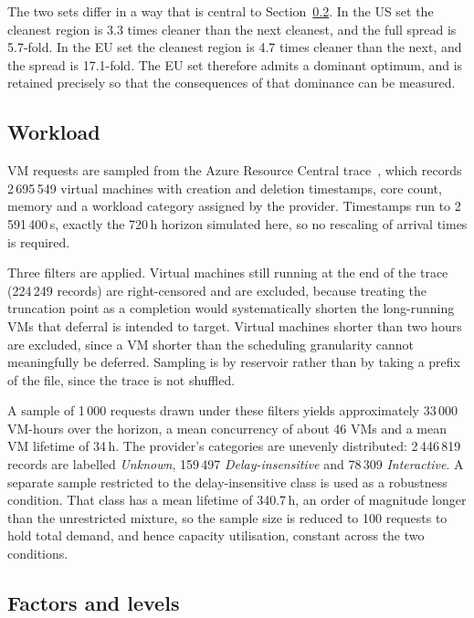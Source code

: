 The two sets differ in a way that is central to
Section~\ref{sec:design-factors}. In the US set the cleanest region is 3.3
times cleaner than the next cleanest, and the full spread is 5.7-fold. In the
EU set the cleanest region is 4.7 times cleaner than the next, and the spread is
17.1-fold. The EU set therefore admits a dominant optimum, and is retained
precisely so that the consequences of that dominance can be measured.

\subsection{Workload}

VM requests are sampled from the Azure Resource Central
trace~\cite{cortez2017resourcecentral,azurepublicdataset}, which records 2\,695\,549 virtual machines with creation and
deletion timestamps, core count, memory and a workload category assigned by the
provider. Timestamps run to 2\,591\,400\,s, exactly the 720\,h horizon
simulated here, so no rescaling of arrival times is required.

Three filters are applied. Virtual machines still running at the end of the
trace (224\,249 records) are right-censored and are excluded, because treating
the truncation point as a completion would systematically shorten the
long-running VMs that deferral is intended to target. Virtual machines shorter
than two hours are excluded, since a VM shorter than the scheduling granularity
cannot meaningfully be deferred. Sampling is by reservoir rather than by taking
a prefix of the file, since the trace is not shuffled.

A sample of 1\,000 requests drawn under these filters yields approximately
33\,000 VM-hours over the horizon, a mean concurrency of about 46 VMs and a
mean VM lifetime of 34\,h. The provider's categories are unevenly distributed:
2\,446\,819 records are labelled \emph{Unknown}, 159\,497
\emph{Delay-insensitive} and 78\,309 \emph{Interactive}. A separate sample
restricted to the delay-insensitive class is used as a robustness condition.
That class has a mean lifetime of 340.7\,h, an order of magnitude longer than
the unrestricted mixture, so the sample size is reduced to 100 requests to hold
total demand, and hence capacity utilisation, constant across the two
conditions.

\subsection{Factors and levels}
\label{sec:design-factors}

